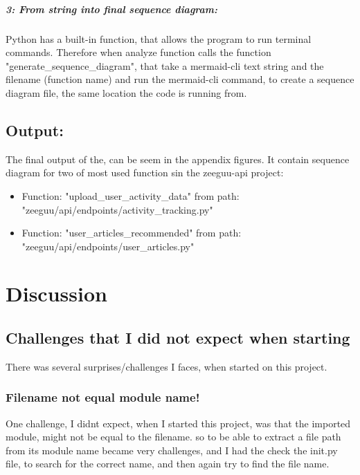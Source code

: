 \documentclass[12pt,a4paper]{report}
\begin{document}
    \paragraph{3: From string into final sequence diagram:}
    Python has a built-in function, that allows the program to run terminal commands. Therefore when analyze function calls the function "generate\_sequence\_diagram", that take a mermaid-cli text string and the filename (function name) and run the mermaid-cli command, to create a sequence diagram file, the same location the code is running from. 
    
    \section{Output:}
    The final output of the, can be seem in the appendix figures. It contain sequence diagram for two of most used function sin the zeeguu-api project: 

    \begin{itemize}
        \item Function: "upload\_user\_activity\_data" from path: "zeeguu/api/endpoints/activity\_tracking.py"
        \item Function: "user\_articles\_recommended" from path: "zeeguu/api/endpoints/user\_articles.py"
    \end{itemize}



    


    \chapter{Discussion}

    \section{Challenges that I did not expect when starting}

    There was several surprises/challenges I faces, when started on this project. 

    \subsection{Filename not equal module name!}
    One challenge, I didnt expect, when I started this project, was that the imported module, might not be equal to the filename. 
    so to be able to extract a file path from its module name became very challenges, and I had the check the init.py file, to search for the correct name, and then again try to find the file name. 
\end{document}
